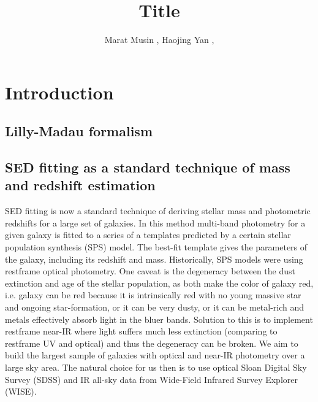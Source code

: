 \documentclass[apj,iop]{emulateapj}
\begin{document}

\title{Title
}
\author{Marat Musin  , 
Haojing Yan , 
}




\begin{abstract}


\end{abstract}


\section{Introduction}

\subsection{Lilly-Madau formalism}

\subsection{SED fitting as a standard technique of mass and redshift estimation}
SED fitting is now a standard technique of deriving stellar mass and photometric redshifts for a large set of galaxies. In this method multi-band photometry for a given galaxy is fitted to a series of a templates predicted by a certain stellar population synthesis (SPS) model. The best-fit template gives the parameters of the galaxy, including its redshift and mass.
Historically, SPS models were using restframe optical photometry. One caveat is the degeneracy between the dust extinction and age of the stellar population, as both make the color of galaxy red, i.e. galaxy can be red because it is intrinsically red with no young massive star and ongoing star-formation, or it can be very dusty, or it can be metal-rich and metals effectively absorb light in the bluer bands. Solution to this is to implement restframe near-IR where light suffers much less extinction (comparing to restframe UV and optical) and thus the degeneracy can be broken.
We aim to build the largest sample of galaxies with optical and near-IR photometry over a large sky area. The natural choice for us then is to use optical Sloan Digital Sky Survey (SDSS) and IR all-sky data from Wide-Field Infrared Survey Explorer (WISE).
\end{document}
